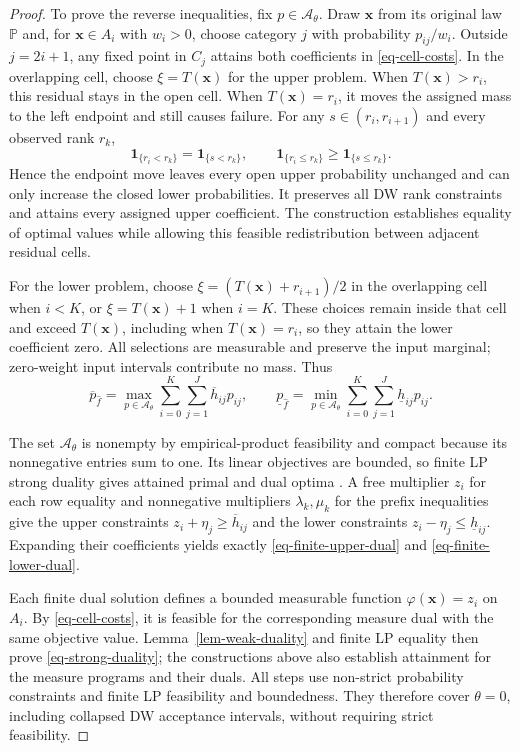 \begin{proof}
  To prove the reverse inequalities, fix $p\in\mathcal A_\theta$. Draw $\bm x$ from its original law $\mathbb P$ and, for $\bm x\in A_i$ with $w_i>0$, choose category $j$ with probability $p_{ij}/w_i$. Outside $j=2i+1$, any fixed point in $C_j$ attains both coefficients in \eqref{eq-cell-costs}. In the overlapping cell, choose $\xi=T(\bm x)$ for the upper problem. When $T(\bm x)>r_i$, this residual stays in the open cell. When $T(\bm x)=r_i$, it moves the assigned mass to the left endpoint and still causes failure. For any $s\in(r_i,r_{i+1})$ and every observed rank $r_k$,
  \[
    \mathbf1_{\{r_i<r_k\}}=\mathbf1_{\{s<r_k\}},\qquad
    \mathbf1_{\{r_i\le r_k\}}\ge\mathbf1_{\{s\le r_k\}}.
  \]
  Hence the endpoint move leaves every open upper probability unchanged and can only increase the closed lower probabilities. It preserves all DW rank constraints and attains every assigned upper coefficient. The construction establishes equality of optimal values while allowing this feasible redistribution between adjacent residual cells.

  For the lower problem, choose $\xi=(T(\bm x)+r_{i+1})/2$ in the overlapping cell when $i<K$, or $\xi=T(\bm x)+1$ when $i=K$. These choices remain inside that cell and exceed $T(\bm x)$, including when $T(\bm x)=r_i$, so they attain the lower coefficient zero. All selections are measurable and preserve the input marginal; zero-weight input intervals contribute no mass. Thus
  \begin{equation}
    \overline p_{\hat f}=\max_{p\in\mathcal A_\theta}\sum_{i=0}^K\sum_{j=1}^J\overline h_{ij}p_{ij},\qquad
    \underline p_{\hat f}=\min_{p\in\mathcal A_\theta}\sum_{i=0}^K\sum_{j=1}^J\underline h_{ij}p_{ij}.
    \label{eq-finite-primal-values}
  \end{equation}

  The set $\mathcal A_\theta$ is nonempty by empirical-product feasibility and compact because its nonnegative entries sum to one. Its linear objectives are bounded, so finite LP strong duality gives attained primal and dual optima \citep[Section~5.2.3]{B.V04}. A free multiplier $z_i$ for each row equality and nonnegative multipliers $\lambda_k,\mu_k$ for the prefix inequalities give the upper constraints $z_i+\eta_j\ge\overline h_{ij}$ and the lower constraints $z_i-\eta_j\le\underline h_{ij}$. Expanding their coefficients yields exactly \eqref{eq-finite-upper-dual} and \eqref{eq-finite-lower-dual}.

  Each finite dual solution defines a bounded measurable function $\varphi(\bm x)=z_i$ on $A_i$. By \eqref{eq-cell-costs}, it is feasible for the corresponding measure dual with the same objective value. Lemma~\ref{lem-weak-duality} and finite LP equality then prove \eqref{eq-strong-duality}; the constructions above also establish attainment for the measure programs and their duals. All steps use non-strict probability constraints and finite LP feasibility and boundedness. They therefore cover $\theta=0$, including collapsed DW acceptance intervals, without requiring strict feasibility.
\end{proof}

